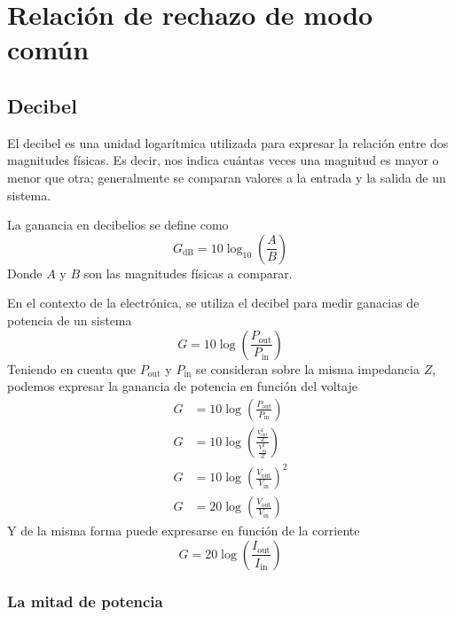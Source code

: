 \section{Relación de rechazo de modo común}

\subsection{Decibel}

El decibel es una unidad logarítmica utilizada para expresar la relación entre dos magnitudes físicas. Es decir, nos indica cuántas veces una magnitud es mayor o menor que otra; generalmente se comparan valores a la entrada y la salida de un sistema.

La ganancia en decibelios se define como 
\[
  G_\text{dB} = 10\log_{10}\left(\frac{A}{B}\right)
\]
Donde \(A\) y \(B\) son las magnitudes físicas a comparar.

En el contexto de la electrónica, se utiliza el decibel para medir ganacias de potencia de un sistema
\[
  G=10\log\left(\frac{P_\text{out}}{P_\text{in}}\right)
\]
Teniendo en cuenta que \(P_\text{out}\) y \(P_\text{in}\) se consideran sobre la misma impedancia \(Z\), podemos expresar la ganancia de potencia en función del voltaje
\begin{align*}
  G&=10\log\left(\frac{P_\text{out}}{P_\text{in}}\right) \\
  G&=10\log\left(\frac{\frac{V_\text{out}^2}{Z}}{\frac{V_\text{in}^2}{Z}}\right) \\
  G&=10\log\left(\frac{V_\text{out}}{V_\text{in}}\right)^2\\
  G&=20\log\left(\frac{V_\text{out}}{V_\text{in}}\right)
\end{align*}
Y de la misma forma puede expresarse en función de la corriente 
\[
  G=20 \log\left(\frac{I_\text{out}}{I_\text{in}}\right)
\]

\subsubsection{La mitad de potencia}

